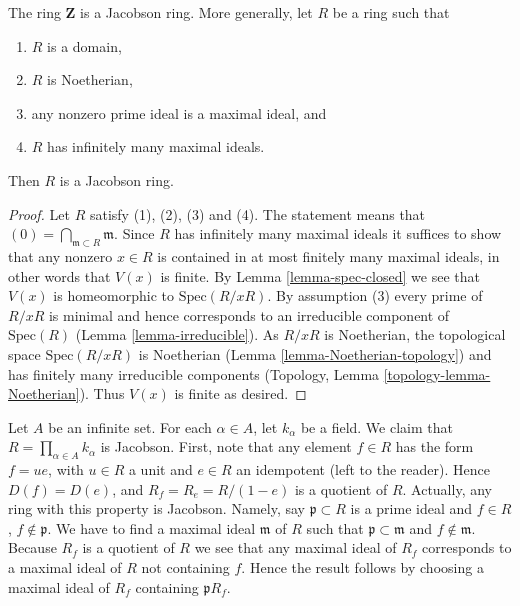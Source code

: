 \begin{lemma}
\label{lemma-pid-jacobson}
The ring $\mathbf{Z}$ is a Jacobson ring.
More generally, let $R$ be a ring such that
\begin{enumerate}
\item $R$ is a domain,
\item $R$ is Noetherian,
\item any nonzero prime ideal is a maximal ideal, and
\item $R$ has infinitely many maximal ideals.
\end{enumerate}
Then $R$ is a Jacobson ring.
\end{lemma}

\begin{proof}
Let $R$ satisfy (1), (2), (3) and (4). The statement
means that $(0) = \bigcap_{\mathfrak m \subset R} \mathfrak m$.
Since $R$ has infinitely many maximal ideals it suffices to
show that any nonzero $x \in R$ is contained in at most
finitely many maximal ideals, in other words that $V(x)$ is finite.
By Lemma \ref{lemma-spec-closed}
we see that $V(x)$ is homeomorphic to $\text{Spec}(R/xR)$.
By assumption (3) every prime of $R/xR$ is minimal and hence
corresponds to an irreducible component of $\text{Spec}(R)$
(Lemma \ref{lemma-irreducible}).
As $R/xR$ is Noetherian, the topological space $\text{Spec}(R/xR)$
is Noetherian (Lemma \ref{lemma-Noetherian-topology})
and has finitely many irreducible components
(Topology, Lemma \ref{topology-lemma-Noetherian}).
Thus $V(x)$ is finite as desired.
\end{proof}

\begin{example}
\label{example-infinite-product-fields-jacobson}
Let $A$ be an infinite set.
For each $\alpha \in A$, let $k_\alpha$ be a field.
We claim that $R = \prod_{\alpha\in A} k_\alpha$ is Jacobson.
First, note that any element $f \in R$ has the form
$f = ue$, with $u \in R$ a unit and $e\in R$ an idempotent
(left to the reader).
Hence $D(f) = D(e)$, and $R_f = R_e = R/(1-e)$ is a quotient of $R$.
Actually, any ring with this property is Jacobson.
Namely, say $\mathfrak p \subset R$ is a prime ideal
and $f \in R$, $f \not \in \mathfrak p$. We have to find
a maximal ideal $\mathfrak m$ of $R$ such that
$\mathfrak p \subset \mathfrak m$ and $f \not\in \mathfrak m$.
Because $R_f$ is a quotient of $R$ we see that any maximal
ideal of $R_f$ corresponds to a maximal ideal of $R$
not containing $f$. Hence the result follows
by choosing a maximal ideal of $R_f$ containing $\mathfrak p R_f$.
\end{example}

